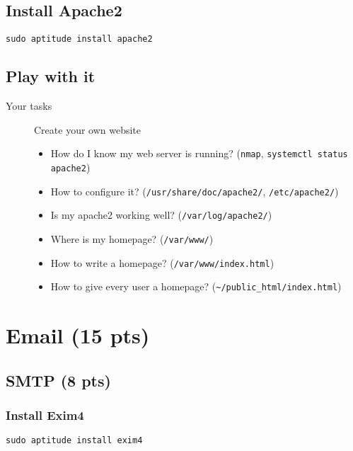 \documentclass{article} [NO-DEFAULT-PACKAGES] \usepackage{wx672hyperref}
\begin{document}
\subsection{Install Apache2}
\label{sec:org44ba9b6}
\begin{verbatim}
sudo aptitude install apache2
\end{verbatim}

\subsection{Play with it}
\label{sec:org680bb48}
\begin{description}
\item[{Your tasks}] Create your own website
\begin{itemize}
\item How do I know my web server is running? (\texttt{nmap}, \texttt{systemctl status apache2})
\item How to configure it? (\texttt{/usr/share/doc/apache2/}, \texttt{/etc/apache2/})
\item Is my apache2 working well? (\texttt{/var/log/apache2/})
\item Where is my homepage? (\texttt{/var/www/})
\item How to write a homepage? (\texttt{/var/www/index.html})
\item How to give every user a homepage? (\texttt{\textasciitilde{}/public\_html/index.html})
\end{itemize}
\end{description}

\section{Email (15 pts)}
\label{sec:org8db2ffd}
\subsection{SMTP (8 pts)}
\label{sec:org03e6550}
\subsubsection{Install Exim4}
\label{sec:org19b9fff}
\begin{verbatim}
sudo aptitude install exim4
\end{verbatim}
\end{document}
